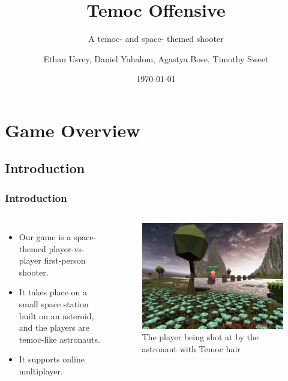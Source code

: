 \documentclass{beamer}
\title{Temoc Offensive}
\subtitle{A temoc- and space- themed shooter}
\author{Ethan Usrey, Daniel Yahalom, Agastya Bose, Timothy Sweet}
\institute{The University of Texas at Dallas}
\date{\today}
\begin{document}
\begin{frame}
\titlepage
\end{frame}

\section{Game Overview}
\subsection{Introduction}

\begin{frame}
\frametitle{Introduction}
    \begin{columns}
    \begin{itemize}
        \item Our game is a space-themed player-vs-player first-person shooter.
        \item It takes place on a small space station built on an asteroid, and the players are temoc-like astronauts.
        \item It supports online multiplayer.
    \end{itemize}
        \begin{figure}
            \includegraphics[width=\textwidth]{being_shot_at}
            \caption{The player being shot at by the astronaut with Temoc hair}
        \end{figure}
    \end{columns}
\end{frame}
\end{document}
